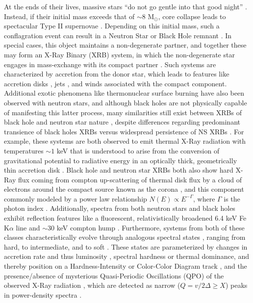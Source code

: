 \documentclass[fleqn,usenatbib]{mnras}
\begin{document}
At the ends of their lives, massive stars ``do not go gentle into that good night'' \citep{thomas1952country}. Instead, if their initial mass exceeds that of $\sim8$ M$_\odot$, core collapse leads to spectacular Type II supernovae \citep{shull1995}. Depending on this initial mass, such a conflagration event can result in a Neutron Star or Black Hole remnant \citep{gilmore2004}. In special cases, this object maintains a non-degenerate partner, and together these may form an X-Ray Binary (XRB) system, in which the non-degenerate star engages in mass-exchange with its compact partner \citep{tauris2006}. Such systems are characterized by accretion from the donor star, which leads to features like accretion disks \citep{SS73}, jets \citep{gallo2005,neutronstarjet}, and winds \citep{bhwinds,neutronStarWind} associated with the compact component. Additional exotic phenomena like thermonuclear surface burning  \citep{thermonuclear} have also been observed with neutron stars, and although black holes are not physically capable of manifesting this latter process, many similarities still exist between XRBs of black hole and neutron star nature \citep{VanDerKlis1994}, despite differences regarding predominant transience of black holes XRBs \citep{belloni_motta2016} versus widespread persistence of NS XRBs \citep{done_afraid}. For example, these systems are both observed to emit thermal X-Ray radiation with temperatures $\sim1$ keV that is understood to arise from the conversion of gravitational potential to radiative energy in an optically thick, geometrically thin accretion disk \citep{SS73}. Black hole and neutron star XRBs both also show hard X-Ray flux coming from compton up-scattering of thermal disk flux by a cloud of electrons around the compact source known as the corona \citep{corona_1979,coronae_1982}, and this component commonly modeled by a power law relationship $N(E)\propto E^{-\Gamma}$, where $\Gamma$ is the photon index \citep{McClintockRemillard2006}. Additionally, spectra from both neutron stars and black holes exhibit reflection features like a fluorescent, relativistically broadened 6.4 keV Fe K$\alpha$ line \citep{iron_lines_1989} and $\sim30$ keV compton hump \citep{x-ray_reflection_models_2005}. Furthermore, systems from both of these classes characteristically evolve through analogous spectral states \citep{gardenier2018}, ranging from hard, to intermediate, and to soft \citep{McClintockRemillard2006}. These states are parameterized by changes in accretion rate and thus luminosity \citep{terrabyte_done}, spectral hardness or thermal dominance, and thereby position on a Hardness-Intensity or Color-Color Diagram track \citep{ingram2019}, and the presence/absence of mysterious  Quasi-Periodic Oscillations (QPO) of the observed X-Ray radiation \citep{McClintockRemillard2006}, which are detected as narrow ($Q=v/2\Delta\geq X$) peaks in power-density spectra \citep{homanBelloniQPOstates}.
\end{document}
